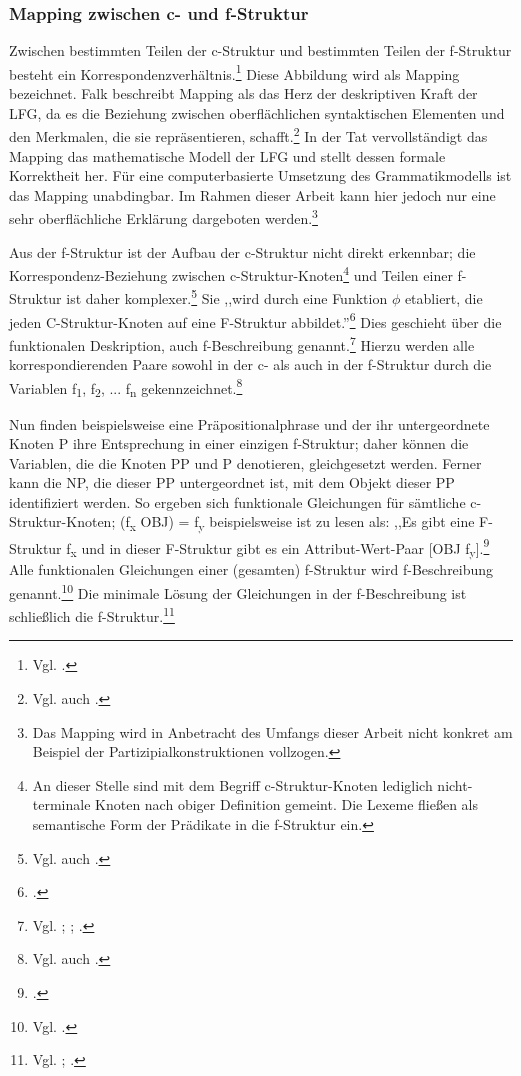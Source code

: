 \documentclass[12pt,a4paper]{article}
\begin{document}
\subsubsection{Mapping zwischen c- und f-Struktur}
Zwischen bestimmten Teilen der c-Struktur und bestimmten Teilen der f-Struktur besteht ein Korrespondenzverhältnis.\footnote{Vgl. \cite[8]{Skript}.} Diese Abbildung wird als Mapping bezeichnet. Falk beschreibt Mapping als das Herz der deskriptiven Kraft der LFG, da es die Beziehung zwischen oberflächlichen syntaktischen Elementen und den Merkmalen, die sie repräsentieren, schafft.\footnote{Vgl. auch \cite[62; 68]{Falk}.} In der Tat vervollständigt das Mapping das mathematische Modell der LFG und stellt dessen formale Korrektheit her. Für eine computerbasierte Umsetzung des Grammatikmodells ist das Mapping unabdingbar. Im Rahmen dieser Arbeit kann hier jedoch nur eine sehr oberflächliche Erklärung dargeboten werden.\footnote{Das Mapping wird in Anbetracht des Umfangs dieser Arbeit nicht konkret am Beispiel der Partizipialkonstruktionen vollzogen.}

Aus der f-Struktur ist der Aufbau der c-Struktur nicht direkt erkennbar; die Korrespondenz-Beziehung zwischen c-Struktur-Knoten\footnote{An dieser Stelle sind mit dem Begriff c-Struktur-Knoten lediglich nicht-terminale Knoten nach obiger Definition gemeint. Die Lexeme fließen als semantische Form der Prädikate in die f-Struktur ein.} und Teilen einer f-Struktur ist daher komplexer.\footnote{Vgl. auch \cite[55]{Falk}.} Sie ,,wird durch eine Funktion $\phi$ etabliert, die jeden C-Struktur-Knoten auf eine F-Struktur abbildet.''\footnote{\cite[8]{Skript}.} Dies geschieht über die funktionalen Deskription, auch f-Beschreibung genannt.\footnote{Vgl. \cite[63-4]{Falk}; \cite[34]{Rohrer}; \cite[17]{Skript}.} Hierzu werden alle korrespondierenden Paare sowohl in der c- als auch in der f-Struktur durch die Variablen f\textsubscript{1}, f\textsubscript{2}, ... f\textsubscript{n} gekennzeichnet.\footnote{Vgl. auch \cite[65]{Falk}.} 

Nun finden beispielsweise eine Präpositionalphrase und der ihr untergeordnete Knoten P ihre Entsprechung in einer einzigen f-Struktur; daher können die Variablen, die die Knoten PP und P denotieren, gleichgesetzt werden. Ferner kann die NP, die dieser PP untergeordnet ist, mit dem Objekt dieser PP identifiziert werden. So ergeben sich funktionale Gleichungen für sämtliche c-Struktur-Knoten; (f\textsubscript{x} OBJ) = f\textsubscript{y} beispielsweise ist zu lesen als: ,,Es gibt eine F-Struktur f\textsubscript{x} und in dieser F-Struktur gibt es ein Attribut-Wert-Paar [OBJ f\textsubscript{y}].\footnote{\cite[12]{Skript}.}
Alle funktionalen Gleichungen einer (gesamten) f-Struktur wird f-Beschreibung genannt.\footnote{Vgl. \cite[66-8]{Falk}.} Die minimale Lösung der Gleichungen in der f-Beschreibung ist schließlich die f-Struktur.\footnote{Vgl. \cite[68]{Falk}; \cite[17]{Skript}.}
\end{document}
